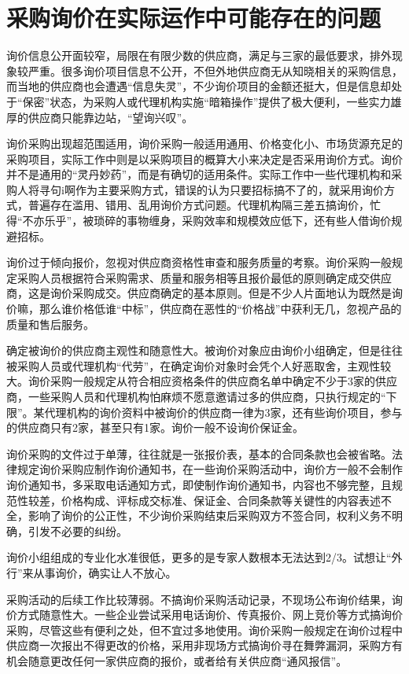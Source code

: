 \section {采购询价在实际运作中可能存在的问题}

    \begin{enumerate.zh}
        \item 询价信息公开面较窄，局限在有限少数的供应商，满足与三家的最低要求，排外现象较严重。很多询价项目信息不公开，不但外地供应商无从知晓相关的采购信息，而当地的供应商也会遭遇“信息失灵”，不少询价项目的金额还挺大，但是信息却处于“保密”状态，为采购人或代理机构实施“暗箱操作”提供了极大便利，一些实力雄厚的供应商只能靠边站，“望询兴叹”。

        \item 询价采购出现超范围适用，询价采购一般适用通用、价格变化小、市场货源充足的采购项目，实际工作中则是以采购项目的概算大小来决定是否采用询价方式。询价并不是通用的“灵丹妙药”，而是有确切的适用条件。实际工作中一些代理机构和采购人将寻句i啊作为主要采购方式，错误的认为只要招标搞不了的，就采用询价方式，普遍存在滥用、错用、乱用询价方式问题。代理机构隔三差五搞询价，忙得“不亦乐乎”，被琐碎的事物缠身，采购效率和规模效应低下，还有些人借询价规避招标。

        \item 询价过于倾向报价，忽视对供应商资格性审查和服务质量的考察。询价采购一般规定采购人员根据符合采购需求、质量和服务相等且报价最低的原则确定成交供应商，这是询价采购成交。供应商确定的基本原则。但是不少人片面地认为既然是询价嘛，那么谁价格低谁“中标”，供应商在恶性的“价格战”中获利无几，忽视产品的质量和售后服务。

        \item 确定被询价的供应商主观性和随意性大。被询价对象应由询价小组确定，但是往往被采购人员或代理机构“代劳”，在确定询价对象时会凭个人好恶取舍，主观性较大。询价采购一般规定从符合相应资格条件的供应商名单中确定不少于3家的供应商，一些采购人员和代理机构怕麻烦不愿意邀请过多的供应商，只执行规定的“下限”。某代理机构的询价资料中被询价的供应商一律为3家，还有些询价项目，参与的供应商只有2家，甚至只有1家。询价一般不设询价保证金。

        \item 询价采购的文件过于单薄，往往就是一张报价表，基本的合同条款也会被省略。法律规定询价采购应制作询价通知书，在一些询价采购活动中，询价方一般不会制作询价通知书，多采取电话通知方式，即使制作询价通知书，内容也不够完整，且规范性较差，价格构成、评标成交标准、保证金、合同条款等关键性的内容表述不全，影响了询价的公正性，不少询价采购结束后采购双方不签合同，权利义务不明确，引发不必要的纠纷。

        \item 询价小组组成的专业化水准很低，更多的是专家人数根本无法达到2/3。试想让“外行”来从事询价，确实让人不放心。

        \item 采购活动的后续工作比较薄弱。不搞询价采购活动记录，不现场公布询价结果，询价方式随意性大。一些企业尝试采用电话询价、传真报价、网上竞价等方式搞询价采购，尽管这些有便利之处，但不宜过多地使用。询价采购一般规定在询价过程中供应商一次报出不得更改的价格，采用非现场方式搞询价寻在舞弊漏洞，采购方有机会随意更改任何一家供应商的报价，或者给有关供应商“通风报信”。

    \end{enumerate.zh}
